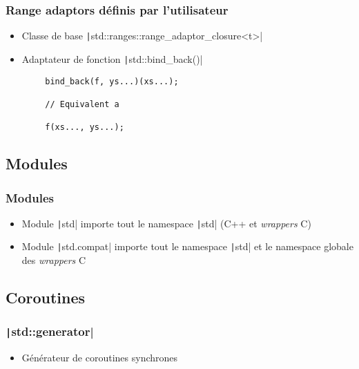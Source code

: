 \documentclass[C++.tex]{subfiles}
\begin{document}
\begin{frame}[fragile]
	\frametitle{Range adaptors définis par l'utilisateur}
	\begin{itemize}
		\item Classe de base \texttt|std::ranges::range_adaptor_closure<t>|
		\item Adaptateur de fonction \texttt|std::bind_back()|
	\end{itemize}

	\begin{verbatim}
		bind_back(f, ys...)(xs...);

		// Equivalent a

		f(xs..., ys...);
	\end{verbatim}

\end{frame}

\subsection*{Modules}
\begin{frame}[fragile]
	\frametitle{Modules}
	\begin{itemize}
		\item Module \texttt|std| importe tout le namespace \texttt|std| (C++ et \textit{wrappers} C)
		\item Module \texttt|std.compat| importe tout le namespace \texttt|std| et le namespace globale des \textit{wrappers} C
	\end{itemize}

\end{frame}

\subsection*{Coroutines}
\begin{frame}[fragile]
	\frametitle{\texttt|std::generator|}
	\begin{itemize}
		\item Générateur de coroutines synchrones
	\end{itemize}

\end{frame}
\end{document}
